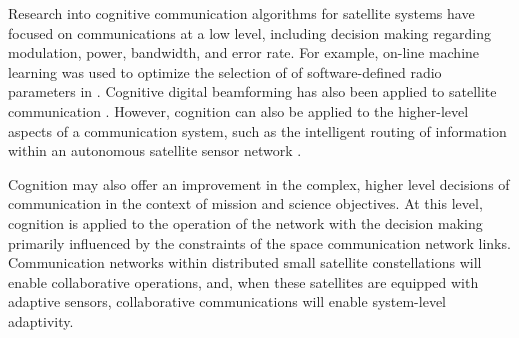\documentclass[conference]{IEEEtran}
\begin{document}

Research into cognitive communication algorithms for satellite systems have focused on communications at a low level, including decision making regarding modulation, power, bandwidth, and error rate.  For example, on-line machine learning was used to optimize the selection of of software-defined radio parameters in \cite{ref4}.  Cognitive digital beamforming has also been applied to satellite communication \cite{ref5}.  However, cognition can also be applied to the higher-level aspects of a communication system, such as the intelligent routing of information within an autonomous satellite sensor network \cite{ref7}.

Cognition may also offer an improvement in the complex, higher level decisions of communication in the context of mission and science objectives.  At this level, cognition is applied to the operation of the network with the decision making primarily influenced by the constraints of the space communication network links.  Communication networks within distributed small satellite constellations will enable collaborative operations, and, when these satellites are equipped with adaptive sensors, collaborative communications will enable system-level adaptivity.
\end{document}
